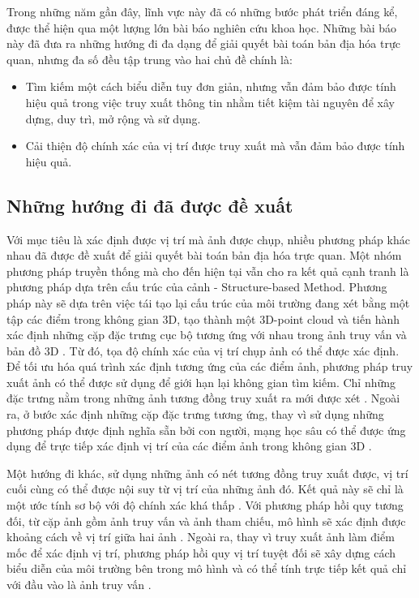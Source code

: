 Trong những năm gần đây, lĩnh vực này đã có những bước phát triển đáng kể, được thể hiện qua một lượng lớn bài báo nghiên cứu khoa học. Những bài báo này đã đưa ra những hướng đi đa dạng để giải quyết bài toán bản địa hóa trực quan, nhưng đa số đều tập trung vào hai chủ đề chính là:
\begin{itemize}
    \item Tìm kiếm một cách biểu diễn tuy đơn giản, nhưng vẫn đảm bảo được tính hiệu quả trong việc truy xuất thông tin nhằm tiết kiệm tài nguyên để xây dựng, duy trì, mở rộng và sử dụng.
    \item Cải thiện độ chính xác của vị trí được truy xuất mà vẫn đảm bảo được tính hiệu quả.
\end{itemize}

\subsection*{Những hướng đi đã được đề xuất}

Với mục tiêu là xác định được vị trí mà ảnh được chụp, nhiều phương pháp khác nhau đã được đề xuất để giải quyết bài toán bản địa hóa trực quan. Một nhóm phương pháp truyền thống mà cho đến hiện tại vẫn cho ra kết quả cạnh tranh là phương pháp dựa trên cấu trúc của cảnh - Structure-based Method. Phương pháp này sẽ dựa trên việc tái tạo lại cấu trúc của môi trường đang xét bằng một tập các điểm trong không gian 3D, tạo thành một 3D-point cloud và tiến hành xác định những cặp đặc trưng cục bộ tương ứng với nhau trong ảnh truy vấn và bản đồ 3D \cite{sattler2011fast}. Từ đó, tọa độ chính xác của vị trí chụp ảnh có thể được xác định. Để tối ưu hóa quá trình xác định tương ứng của các điểm ảnh, phương pháp truy xuất ảnh có thể được sử dụng để giới hạn lại không gian tìm kiếm. Chỉ những đặc trưng nằm trong những ảnh tương đồng truy xuất ra mới được xét \cite{sarlin2019coarse}. Ngoài ra, ở bước xác định những cặp đặc trưng tương ứng, thay vì sử dụng những phương pháp được định nghĩa sẵn bởi con người, mạng học sâu có thể được ứng dụng để trực tiếp xác định vị trí của các điểm ảnh trong không gian 3D \cite{brachmann2021visual}. 

Một hướng đi khác, sử dụng những ảnh có nét tương đồng truy xuất được, vị trí cuối cùng có thể được nội suy từ vị trí của những ảnh đó. Kết quả này sẽ chỉ là một ước tính sơ bộ với độ chính xác khá thấp \cite{pion2020benchmarking}. Với phương pháp hồi quy tương đối, từ cặp ảnh gồm ảnh truy vấn và ảnh tham chiếu, mô hình sẽ xác định được khoảng cách về vị trí giữa hai ảnh \cite{zhou2020learn}. Ngoài ra, thay vì truy xuất ảnh làm điểm mốc để xác định vị trí, phương pháp hồi quy vị trí tuyệt đối sẽ xây dựng cách biểu diễn của môi trường bên trong mô hình và có thể tính trực tiếp kết quả chỉ với đầu vào là ảnh truy vấn \cite{kendall2016posenet}.

